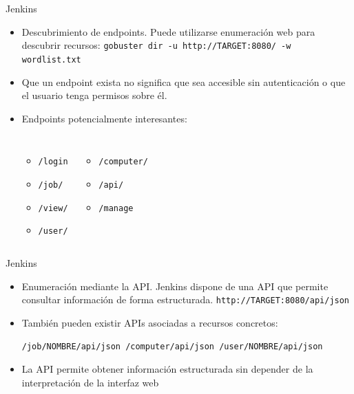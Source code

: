 \documentclass[aspectratio=169,11pt]{beamer}
\newcommand{\cmd}[1]{\texttt{#1}}
\begin{document}
\begin{frame}[fragile]{Jenkins}
  \small
   \begin{itemize} 
  \item Descubrimiento de endpoints. Puede utilizarse enumeración web para descubrir recursos: 
  \cmd{gobuster dir -u http://TARGET:8080/ -w wordlist.txt}
  \item Que un endpoint exista no significa que sea accesible sin autenticación o que el usuario tenga permisos sobre él.
  \item Endpoints potencialmente interesantes:
  \begin{columns}
    \begin{itemize}
      \item \cmd{/login}
      \item \cmd{/job/}
      \item \cmd{/view/}
      \item \cmd{/user/}
    \end{itemize}
    \begin{itemize}
      \item \cmd{/computer/}
      \item \cmd{/api/}
      \item \cmd{/manage}
    \end{itemize}
  \end{columns}
 \end{itemize} 
\end{frame} 

\begin{frame}{Jenkins} 
\small
   \begin{itemize} 
    \item Enumeración mediante la API. Jenkins dispone de una API que permite consultar información de forma estructurada. \cmd{http://TARGET:8080/api/json}
    \item También pueden existir APIs asociadas a recursos concretos:
     \begin{center}\cmd{/job/NOMBRE/api/json /computer/api/json /user/NOMBRE/api/json}\end{center} \vspace{0.3cm} 
    \item La API permite obtener información estructurada sin depender de la interpretación de la interfaz web 
    \end{itemize} 
  \end{frame}   
\end{document}
